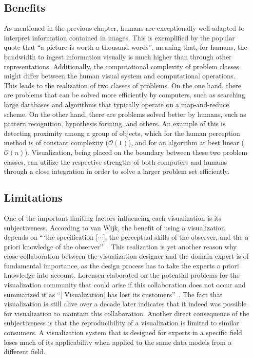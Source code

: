 \subsection{Benefits} \label{cha:intro:vis:benefits}
As mentioned in the previous chapter, humans are exceptionally well adapted to interpret information contained in images.  This is exemplified by the popular quote that ``a picture is worth a thousand words'', meaning that, for humans, the bandwidth to ingest information visually is much higher than through other representations.  Additionally, the computational complexity of problem classes might differ between the human visual system and computational operations.  This leads to the realization of two classes of problems.  On the one hand, there are problems that can be solved more efficiently by computers, such as searching large databases and algorithms that typically operate on a map-and-reduce scheme.  On the other hand, there are problems solved better by humans, such as pattern recognition, hypothesis forming, and others.  An example of this is detecting proximity among a group of objects, which for the human perception method is of constant complexity ($\mathcal{O}\left( 1 \right)$), and for an algorithm at best linear ($\mathcal{O}\left( n \right)$).  Visualization, being placed on the boundary between these two problem classes, can utilize the respective strengths of both computers and humans through a close integration in order to solve a larger problem set efficiently.

\subsection{Limitations} \label{cha:intro:vis:limitations}
One of the important limiting factors influencing each visualization is its subjectiveness.  According to van Wijk, the benefit of using a visualization depends on ```the specification [$\cdots$], the perceptual skills of the observer, and the a priori knowledge of the observer''~\cite{van2005value}.  This realization is yet another reason why close collaboration between the visualization designer and the domain expert is of fundamental importance, as the design process has to take the experts a priori knowledge into account.  Lorensen elaborated on the potential problems for the visualization community that could arise if this collaboration does not occur and summarized it as ``[ Visualization] has lost its customers''~\cite{lorensen2004death}.  The fact that visualization is still alive over a decade later indicates that it indeed was possible for visualization to maintain this collaboration.  Another direct consequence of the subjectiveness is that the reproducibility of a visualization is limited to similar consumers.  A visualization system that is designed for experts in a specific field loses much of its applicability when applied to the same data models from a different field.

